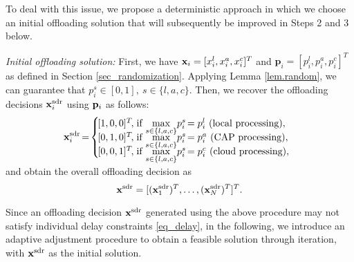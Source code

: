\documentclass[10pt,journal,compsoc]{IEEEtran}
\def\pbf{{\bf p}}
\def\xbf{{\bf x}}
\def\xbf{{\bf x}}
\begin{document}
{To deal with this issue, we propose a deterministic approach in
which we choose an initial offloading solution that will
subsequently be improved in Steps 2 and 3 below.

\emph{Initial offloading solution:} First, we have $\xbf_i =
[x^l_{i},x^a_{i},x^c_{i}]^T$ and $\mathbf{p}_{i} = [p^l_{i},
p^a_{i}, p^c_{i}]^T$ as defined in Section \ref{sec_randomization}.
Applying Lemma \ref{lem.random}, we can guarantee that $p_i^s \in
[0,1],\ s \in \{ l, a, c\}$. Then, we recover the offloading
decisions $\xbf_i^{\text{sdr}}$ using $\pbf_i$ as follows:
\begin{equation}\label{eq_sdr_recovery}
\hspace*{-.2cm}\mathbf{x}_{i}^{\text{sdr}}
\hspace*{-.05cm}=\hspace*{-.05cm}
\begin{cases}
\hspace*{-.05cm}[1,0,0]^T\hspace*{-.05cm},&\hspace*{-.25cm}\text{if}\   \smash{\displaystyle\max_{s\in \{l,a,c\}}}  p_i^s\hspace*{-.05cm}=p^l_{i}\ \text{(local processing)},\\
\hspace*{-.05cm}[0,1,0]^T\hspace*{-.05cm},&\hspace*{-.25cm}\text{if}\  \smash{\displaystyle\max_{s\in \{l,a,c\}}}  p_i^s\hspace*{-.05cm}=p^a_{i}\ \text{(CAP processing)},\\
\hspace*{-.05cm}[0,0,1]^T\hspace*{-.05cm},&\hspace*{-.25cm}\text{if}\  \smash{\displaystyle\max_{s\in \{l,a,c\}}}  p_i^s\hspace*{-.05cm}=p^c_{i}\ \text{(cloud processing)},\\
\end{cases}
\end{equation}
and obtain the overall offloading decision as
\begin{equation*}
\xbf^{\text{sdr}}=[(\xbf_1^{\text{sdr}})^T,\ldots,
(\xbf_N^{\text{sdr}})^T]^T.
\end{equation*}

Since an offloading decision
$\xbf^{\text{sdr}}$
generated using the above procedure may
not satisfy individual delay constraints \eqref{eq_delay}, in the
following, we introduce an adaptive adjustment procedure to obtain a
feasible solution through iteration, with $\xbf^{\text{sdr}}$ as the
initial solution.


}
\end{document}
